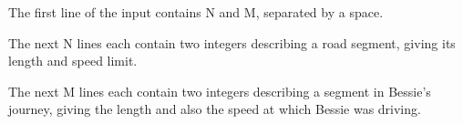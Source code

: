 The first line of the input contains N and M, separated by a space. 

The next N lines each contain two integers describing a road segment, giving its length and speed limit.

The next M lines each contain two integers describing a segment in Bessie's journey, giving the length and also the speed at which Bessie was driving.
